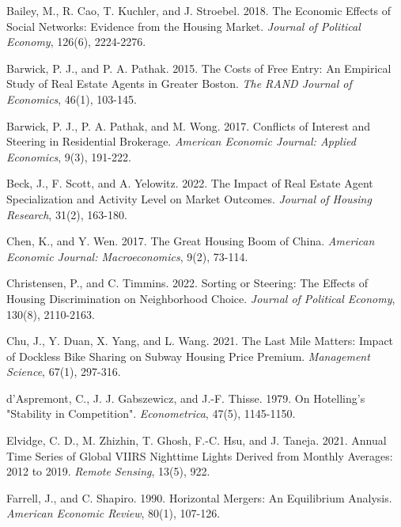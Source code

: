 \documentclass[11pt]{article}
\begin{document}
\begin{singlespace}
\begin{thebibliography}{}
Bailey, M., R. Cao, T. Kuchler, and J. Stroebel. 2018. The Economic Effects of Social Networks: Evidence from the Housing Market. \textit{Journal of Political Economy}, 126(6), 2224-2276. 

Barwick, P. J., and P. A. Pathak. 2015. The Costs of Free Entry: An Empirical Study of Real Estate Agents in Greater Boston. \textit{The RAND Journal of Economics}, 46(1), 103-145. 

Barwick, P. J., P. A. Pathak, and M. Wong. 2017. Conflicts of Interest and Steering in Residential Brokerage. \textit{American Economic Journal: Applied Economics}, 9(3), 191-222. 

Beck, J., F. Scott, and A. Yelowitz. 2022. The Impact of Real Estate Agent Specialization and Activity Level on Market Outcomes. \textit{Journal of Housing Research}, 31(2), 163-180. 

Chen, K., and Y. Wen. 2017. The Great Housing Boom of China. \textit{American Economic Journal: Macroeconomics}, 9(2), 73-114. 

Christensen, P., and C. Timmins. 2022. Sorting or Steering: The Effects of Housing Discrimination on Neighborhood Choice. \textit{Journal of Political Economy}, 130(8), 2110-2163. 

Chu, J., Y. Duan, X. Yang, and L. Wang. 2021. The Last Mile Matters: Impact of Dockless Bike Sharing on Subway Housing Price Premium. \textit{Management Science}, 67(1), 297-316.

d'Aspremont, C., J. J. Gabszewicz, and J.-F. Thisse. 1979. On Hotelling’s "Stability in Competition". \textit{Econometrica}, 47(5), 1145-1150. 

Elvidge, C. D., M. Zhizhin, T. Ghosh, F.-C. Hsu, and J. Taneja. 2021. Annual Time Series of Global VIIRS Nighttime Lights Derived from Monthly Averages: 2012 to 2019. \textit{Remote Sensing}, 13(5), 922. 

Farrell, J., and C. Shapiro. 1990. Horizontal Mergers: An Equilibrium Analysis. \textit{American Economic Review}, 80(1), 107-126. 


\end{thebibliography}
\end{singlespace}
\end{document}
